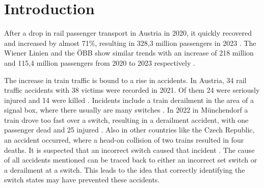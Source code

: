 \chapter{Introduction}
\label{sec:introduction}

After a drop in rail passenger transport in Austria in 2020, it quickly recovered and increased by almost 71\%, resulting in 328,3 million passengers in 2023 \cite{schienenpersonenverkehrAustria}.
The Wiener Linien and the ÖBB show similar trends with an increase of 218 million and 115,4 million passengers from 2020 to 2023 respectively \cite{wienerLinienAustria} \cite{oebbAustria}.

The increase in train traffic is bound to a rise in accidents.
In Austria, 34 rail traffic accidents with 38 victims were recorded in 2021.
Of them 24 were seriously injured and 14 were killed \cite{verkehrstatistik2022}.
Incidents include a train derailment in the area of a signal box, where there usually are many switches \cite{zugEntgleist}.
In 2022 in Münchendorf a train drove too fast over a switch, resulting in a derailment accident, with one passenger dead and 25 injured \cite{zugUnfall1Tod}.
Also in other countries like the Czech Republic, an accident occurred, where a head-on collision of two trains resulted in four deaths.
It is suspected that an incorrect switch caused that incident \cite{zugUnfallFrontal}.
The cause of all accidents mentioned can be traced back to either an incorrect set switch or a derailment at a switch.
This leads to the idea that correctly identifying the switch states may have prevented these accidents.

